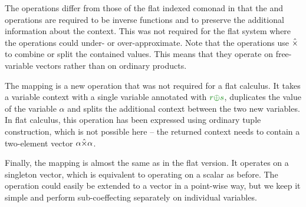 \noindent
The operations differ from those of the flat indexed comonad in that the  and 
 operations are required to be inverse functions and to preserve the additional 
information about the context. This was not required for the flat system where the operations
could under- or over-approximate. Note that the operations use $\hat{\times}$ to combine or
split the contained values. This means that they operate on free-variable vectors rather than 
on ordinary products.

The  mapping is a new operation that was not required for a flat calculus. It 
takes a variable context with a single variable annotated with $\cclrd{r}\cpar\cclrd{s}$,
duplicates the value of the variable $\alpha$ and splits the additional context between the two
new variables. In flat calculus, this operation has been expressed using ordinary tuple 
construction, which is not possible here -- the returned context needs to contain a 
two-element vector $\alpha \hat{\times} \alpha$.

Finally, the  mapping is almost the same as in the flat version. It
operates on a singleton vector, which is equivalent to operating on a scalar as before.
The operation could easily be extended to a vector in a point-wise way, but we keep it simple
and perform sub-coeffecting separately on individual variables.


